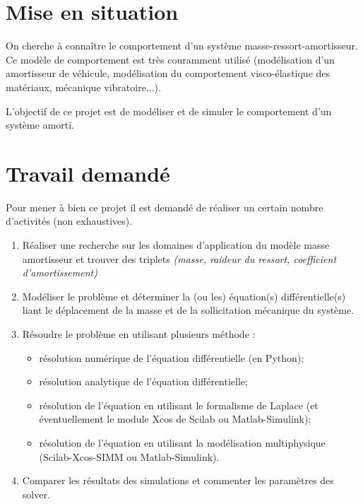 \documentclass[10pt,fleqn]{article} %
\begin{document}

\vspace{10cm}
\pagestyle{fancy}
\thispagestyle{plain}


\def\columnseprulecolor{\color{ocre}}
\setlength{\columnseprule}{0.4pt} 
\begin{multicols}{2}

\section*{Mise en situation}

On cherche à connaître le comportement d'un système masse-ressort-amortisseur. Ce modèle de comportement est très couramment utilisé (modélisation d'un amortisseur de véhicule, modélisation du comportement visco-élastique des matériaux, mécanique vibratoire...).
\begin{obj}
L'objectif de ce projet est de modéliser et de simuler le comportement d'un système amorti.
\end{obj}


\section*{Travail demandé}
Pour mener à bien ce projet il est demandé de réaliser un certain nombre d'activités (non exhaustives).
\begin{enumerate}
\item Réaliser une recherche sur les domaines d'application du modèle masse amortisseur et trouver des triplets \textit{(masse, raideur du ressort, coefficient d'amortissement)}
\item Modéliser le problème et déterminer la (ou les) équation(s) différentielle(s) liant le déplacement de la masse et de la sollicitation mécanique du système.
\item Résoudre le problème en utilisant plusieurs méthode : 
\begin{itemize}
\item résolution numérique de l'équation différentielle (en Python);
\item résolution analytique de l'équation différentielle;
\item résolution de l'équation en utilisant le formalisme de Laplace (et éventuellement le module Xcos de Scilab ou Matlab-Simulink);
\item résolution de l'équation en utilisant la modélisation multiphysique (Scilab-Xcos-SIMM ou Matlab-Simulink).
\end{itemize}
\item Comparer les résultats des simulations et commenter les paramètres des solver.
\end{enumerate}


\end{multicols}
\end{document}
